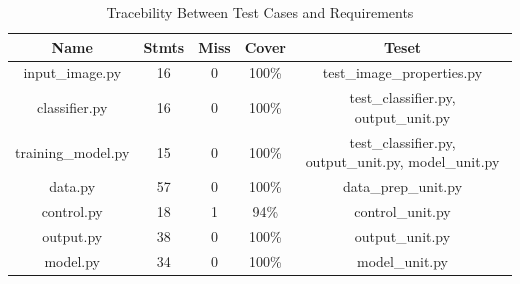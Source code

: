 \documentclass[12pt, titlepage]{article}
\begin{document}
\begin{table}[h!]
  \begin{center}
  \begin{tabular}{| c|c|c|c| c| }
  \hline
   \textbf{Name} &  \textbf{Stmts} &  \textbf{Miss} &  \textbf{Cover} & \textbf{Teset}\\ 
  \hline
  
  input\_image.py & 16 & 0 & 100\% & test\_image\_properties.py\\ 
  \hline
  classifier.py & 16 & 0 & 100\% & test\_classifier.py, output\_unit.py  \\ 
  \hline
  training\_model.py  & 15 & 0 & 100\% & test\_classifier.py, output\_unit.py, model\_unit.py  \\ 
  \hline
  data.py  & 57 & 0 & 100\% & data\_prep\_unit.py\\ 
  \hline
  control.py  & 18 & 1 & 94\% & control\_unit.py  \\ 
  \hline
  output.py & 38 & 0 & 100\% & output\_unit.py  \\ 
  \hline
  model.py  & 34 & 0 & 100\% & model\_unit.py\\ 
   
  \hline
  \end{tabular}
\caption{Tracebility Between Test Cases and Requirements}
\label{tab:code-coverage-metrics}
\end{center}
\end{table}





\end{document}
